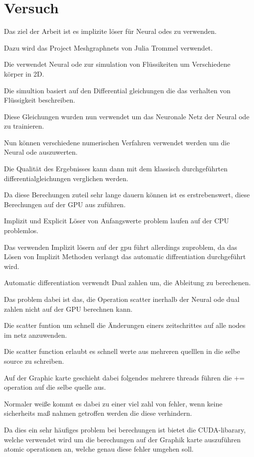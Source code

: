 
\chapter{Versuch}

Das ziel der Arbeit ist es implizite löser für Neural odes zu verwenden.

Dazu wird das Project Meshgraphnets von Julia Trommel verwendet.

Die verwendet Neural ode zur simulation von Flüssikeiten um Verschiedene körper in 2D.

Die simultion basiert auf den Differential gleichungen die das verhalten von Flüssigkeit beschreiben.

Diese Gleichungen wurden nun verwendet um das Neuronale Netz der Neural ode zu trainieren.

Nun können verschiedene numerischen Verfahren verwendet werden um die Neural ode auszuwerten.

Die Qualität des Ergebnisses kann dann mit dem klassisch durchgeführten differentialgleichungen verglichen werden.

Da diese Berechungen zuteil sehr lange dauern können ist es erstrebenswert, diese Berechungen auf der GPU aus
zuführen.


Implizit und Explicit Löser von Anfangswerte problem laufen auf der CPU problemlos.

Das verwenden Implizit lösern auf der gpu führt allerdings zuproblem, da das Lösen von Implizit Methoden 
verlangt das automatic diffrentiation durchgeführt wird.

Automatic differentiation verwendt Dual zahlen um, die Ableitung zu berechenen.

Das problem dabei ist das, die Operation scatter inerhalb der Neural ode dual zahlen nicht auf der GPU 
berechnen kann.

Die scatter funtion um schnell die Änderungen einers zeitschrittes auf alle nodes im netz anzuwenden.


Die scatter function erlaubt es schnell werte aus mehreren quelllen in die selbe source zu schreiben.

Auf der Graphic karte geschieht dabei folgendes mehrere threads führen die += operation auf die selbe quelle aus.

Normaler weiße kommt es dabei zu einer viel zahl von fehler, wenn keine sicherheits maß nahmen getroffen werden die diese verhindern.

Da dies ein sehr häufiges problem bei berechungen ist bietet die CUDA-libarary, welche verwendet wird um die berechungen auf der Graphik karte auszuführen atomic operationen an, welche genau diese fehler umgehen soll.

